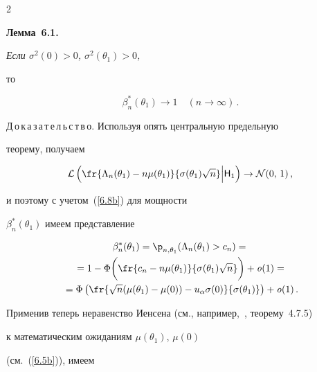 \begin{multicols}{2}
\noindent


{\bf Лемма~6.1.} {\it Если $\sigma^2(0)>0$, $\sigma^2(\theta_1)>0$,


то


$$


\beta_n^*(\theta_1)\to 1\quad (n \to \infty)\,.


$$


}





\medskip





\noindent


Д\,о\,к\,а\,з\,а\,т\,е\,л\,ь\,с\,т\,в\,о. Используя опять центральную предельную


теорему, получаем


\begin{equation*}


{\cal L}\left (\fr{\Lambda_n(\theta_1)-n\mu(\theta_1)}


{\sigma(\theta_1)\sqrt{n}}\Bigl|{\sf H}_1\right )\to {\cal


N}(0,\,1)\,,




\end{equation*} 


и поэтому с учетом~(\ref{6.8b}) для мощности


$\beta_n^*(\theta_1)$ имеем представление


\begin{multline}


\beta_n^*(\theta_1)= {\p}_{n,\theta_1}(\Lambda_n(\theta_1)>c_n) ={}\\


{}=


1-\Phi\biggl(\fr{c_n - n\mu(\theta_1)}


{\sigma(\theta_1)\sqrt{n}}\biggr)+{\it o}(1)= {}\\


{}=\Phi\left(\fr{\sqrt{n}(\mu(\theta_1)-\mu(0))-u_{\alpha}\sigma(0)}


{\sigma(\theta_1)}\right)+{\it o}(1)\,. \label{6.11b}


\end{multline}


Применив теперь неравенство Иенсена (см., например,~\cite{4be}, теорему~4.7.5)


к математическим ожиданиям $\mu(\theta_1)$, $\mu(0)$


(см.~(\ref{6.5b})), имеем



\end{multicols}
